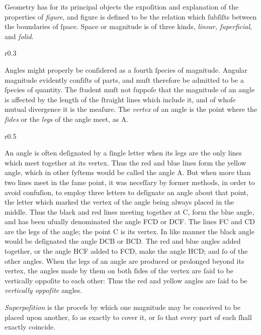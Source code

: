 Geometry has for its principal objects the expoſition and explanation of the properties of \textit{figure}, and figure is defined to be the relation which ſubſiſts between the boundaries of ſpace. Space or magnitude is of three kinds, \textit{linear, ſuperficial}, and \textit{ſolid}.

\begin{wrapfigure}{r}{0.3\textwidth}
  \centering
  
\end{wrapfigure}
Angles might properly be conſidered as a fourth ſpecies of magnitude. Angular magnitude evidently conſiſts of parts, and muſt therefore be admitted to be a ſpecies of quantity. The ſtudent muſt not ſuppoſe that the magnitude of an angle is affected by the length of the ſtraight lines which include it, and of whoſe mutual divergence it is the meaſure. The \textit{vertex} of an angle is the point where the \textit{ſides} or the \textit{legs} of the angle meet, as A.

\begin{wrapfigure}{r}{0.5\textwidth}
  \centering
  
\end{wrapfigure}
An angle is often deſignated by a ſingle letter when its legs are the only lines which meet together at its vertex. Thus the red and blue lines form the yellow angle, which in other ſyſtems would be called the angle A. But when more than two lines meet in the ſame point, it was neceſſary by former methods, in order to avoid confuſion, to employ three letters to deſignate an angle about that point, the letter which marked the vertex of the angle being always placed in the middle.  Thus the black and red lines meeting together at C, form the blue angle, and has been uſually denominated the angle FCD or DCF. The lines FC and CD are the legs of the angle; the point C is its vertex. In like manner the black angle would be deſignated the angle DCB or BCD. The red and blue angles added together, or the angle HCF added to FCD, make the angle HCD; and ſo of the other angles.  When the legs of an angle are produced or prolonged beyond its vertex, the angles made by them on both ſides of the vertex are ſaid to be vertically oppoſite to each other: Thus the red and yellow angles are ſaid to be \textit{vertically oppoſite} angles.

\textit{Superpoſition} is the proceſs by which one magnitude may be conceived to be placed upon another, ſo as exactly to cover it, or ſo that every part of each ſhall exactly coincide.

